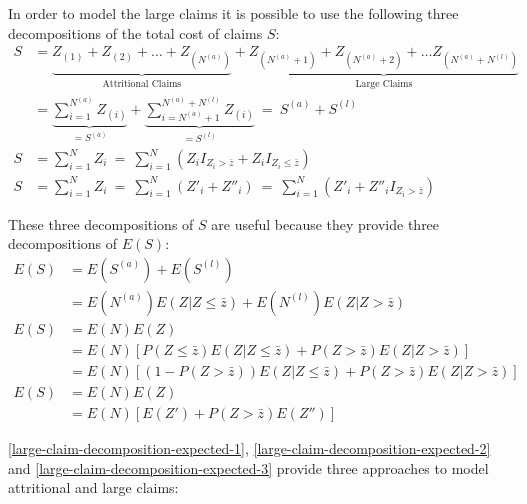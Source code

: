 \documentclass[a4paper, twoside, openright, 12pt]{report}
\theoremstyle{definition}
\theoremstyle{definition}
\theoremstyle{definition}
\theoremstyle{remark}
\begin{document}
In order to model the large claims it is possible to use the following three decompositions of the total cost of claims \(S\):
\begin{align}
  \nonumber
  S & = \underbrace{Z_{(1)} + Z_{(2)} + \dots + Z_{(N^{(a)})}}_{\text{Attritional Claims}} +
        \underbrace{Z_{(N^{(a)} + 1)} + Z_{(N^{(a)} + 2)} + \dots Z_{(N^{(a)} + N^{(l)})}}_{\text{Large Claims}} \\
  \label{large-claim-decomposition-1}
    & = \underbrace{\sum_{i=1}^{N^{(a)}}{Z_{(i)}}}_{=S^{(a)}} +
            \underbrace{\sum_{i = N^{(a)} + 1}^{N^{(a)} + N^{(l)}}{Z_{(i)}}}_{=S^{(l)}}
    \ = \ S^{(a)} + S^{(l)} \\[12pt]
  \label{large-claim-decomposition-2}
  S & = \sum_{i=1}^{N}{Z_i}
    \ = \ \sum_{i=1}^{N}{\left(
      Z_i I_{Z_i>\bar{z}} +
      Z_i I_{Z_i\le\bar{z}}
      \right)} \\[12pt]
  \label{large-claim-decomposition-3}
  S & = \sum_{i=1}^{N}{Z_i}
    \ = \ \sum_{i=1}^{N}{\left(Z'_i + Z''_i\right)}
    \ = \ \sum_{i=1}^{N}{\left(Z'_i + Z''_i I_{Z_i > \bar{z}}\right)}
\end{align}

These three decompositions of \(S\) are useful because they provide three decompositions of \(E(S)\):
\begin{align}
  \nonumber
  E(S) & = E(S^{(a)}) + E(S^{(l)}) \\
    \label{large-claim-decomposition-expected-1}
    & = E(N^{(a)}) E(Z|Z\le\bar{z}) + E(N^{(l)}) E(Z|Z>\bar{z}) \\[12pt]
  \nonumber
  E(S) & = E(N) E(Z) \\
    \nonumber
    & = E(N) \left[P(Z\le\bar{z}) E(Z|Z\le\bar{z}) + P(Z>\bar{z}) E(Z|Z > \bar{z}) \right] \\
    \label{large-claim-decomposition-expected-2}
    & = E(N) \left[\left( 1 - P(Z>\bar{z}) \right) E(Z|Z\le\bar{z}) + P(Z>\bar{z}) E(Z|Z > \bar{z})\right] \\[12pt]
  \nonumber
  E(S) & = E(N) E(Z) \\
    \label{large-claim-decomposition-expected-3}
    & = E(N) \left[E(Z') + P(Z>\bar{z}) E(Z'')\right]
\end{align}

\ref{large-claim-decomposition-expected-1}, \ref{large-claim-decomposition-expected-2} and \ref{large-claim-decomposition-expected-3} provide three approaches to model attritional and large claims:
\end{document}
